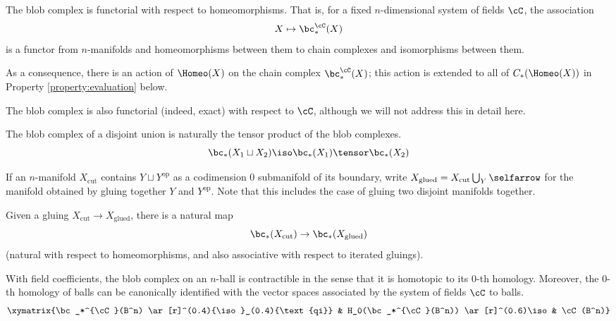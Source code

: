 \begin{property}[Functoriality]
\label{property:functoriality}%
The blob complex is functorial with respect to homeomorphisms. That is, 
for a fixed $n$-dimensional system of fields $\cC$, the association
\begin{equation*}
X \mapsto \bc_*^{\cC}(X)
\end{equation*}
is a functor from $n$-manifolds and homeomorphisms between them to chain complexes and isomorphisms between them.
\end{property}
As a consequence, there is an action of $\Homeo(X)$ on the chain complex $\bc_*^\cC(X)$; this action is extended to all of $C_*(\Homeo(X))$ in Property \ref{property:evaluation} below.

The blob complex is also functorial (indeed, exact) with respect to $\cC$, although we will not address this in detail here.

\begin{property}
\label{property:disjoint-union}
The blob complex of a disjoint union is naturally the tensor product of the blob complexes.
\begin{equation*}
\bc_*(X_1 \du X_2) \iso \bc_*(X_1) \tensor \bc_*(X_2)
\end{equation*}
\end{property}

If an $n$-manifold $X_\text{cut}$ contains $Y \sqcup Y^\text{op}$ as a codimension $0$ submanifold of its boundary, write $X_\text{glued} = X_\text{cut} \bigcup_{Y}\selfarrow$ for the manifold obtained by gluing together $Y$ and $Y^\text{op}$. Note that this includes the case of gluing two disjoint manifolds together.
\begin{property}
\label{property:gluing-map}%
Given a gluing $X_\mathrm{cut} \to X_\mathrm{glued}$, there is
a natural map
\[
	\bc_*(X_\mathrm{cut}) \to \bc_*(X_\mathrm{glued}) 
\]
(natural with respect to homeomorphisms, and also associative with respect to iterated gluings).
\end{property}

\begin{property}[Contractibility]
\label{property:contractibility}%
With field coefficients, the blob complex on an $n$-ball is contractible in the sense that it is homotopic to its $0$-th homology. Moreover, the $0$-th homology of balls can be canonically identified with the vector spaces associated by the system of fields $\cC$ to balls.
\begin{equation}
\xymatrix{\bc_*^{\cC}(B^n) \ar[r]^(0.4){\iso}_(0.4){\text{qi}} & H_0(\bc_*^{\cC}(B^n)) \ar[r]^(0.6)\iso & \cC(B^n)}
\end{equation}
\end{property}

